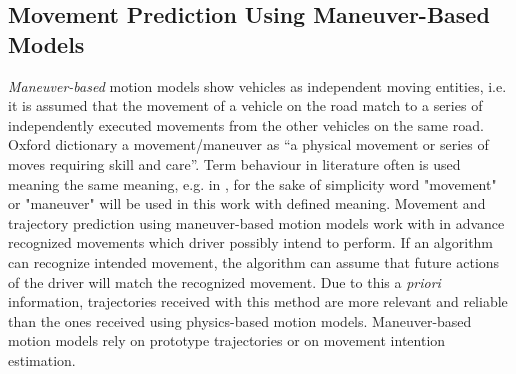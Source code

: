 \subsection{Movement Prediction Using Maneuver-Based Models}
\label{subsection:mb}

\textit{Maneuver-based} motion models show vehicles as independent moving entities, i.e. it is assumed that the movement of a vehicle on the road match to a series of independently executed movements from the other vehicles on the same road. Oxford dictionary \cite{def} a movement/maneuver as “a physical movement or series of moves requiring skill and care”. Term behaviour in literature often is used meaning the same meaning, e.g. in \cite{beh1, beh2, beh3}, for the sake of simplicity word "movement" or "maneuver" will be used in this work with defined meaning. Movement and trajectory prediction using maneuver-based motion models work with in advance recognized movements which driver possibly intend to perform. If an algorithm can recognize intended movement, the algorithm can assume that future actions of the driver will match the recognized movement. Due to this a \textit{priori} information, trajectories received with this method are more relevant and reliable than the ones received using physics-based motion models.  Maneuver-based motion models rely on prototype trajectories or on movement intention estimation. \\


